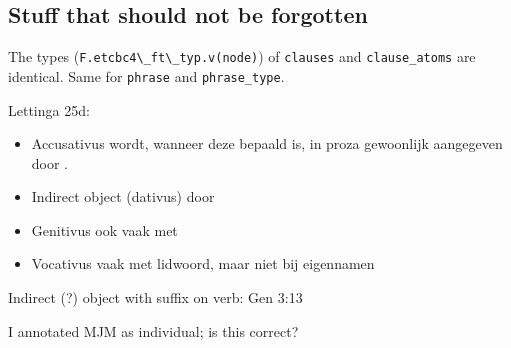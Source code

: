 \documentclass{report}
\newcommand{\mi}[1]{\lstinline{#1}}
\newcommand{\hebr}[1]{\cjRL{#1}}
\begin{document}
\subsection{Stuff that should not be forgotten}
The types (\mi{F.etcbc4\_ft\_typ.v(node)}) of \mi{clauses} and \mi{clause_atoms} are identical. Same for \mi{phrase} and \mi{phrase_type}.

Lettinga 25d:
\begin{itemize}
\item Accusativus wordt, wanneer deze bepaald is, in proza gewoonlijk aangegeven door \hebr{>T}.
\item Indirect object (dativus) door \hebr{L}
\item Genitivus ook vaak met \hebr{L}
\item Vocativus vaak met lidwoord, maar niet bij eigennamen
\end{itemize}

Indirect (?) object with suffix on verb: Gen 3:13

I annotated MJM as individual; is this correct?

\end{document}
